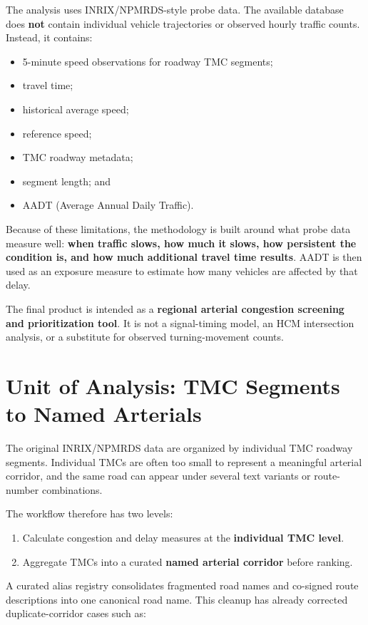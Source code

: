 \documentclass[11pt]{article}
\begin{document}
The analysis uses INRIX/NPMRDS-style probe data. The available database does \textbf{not} contain individual vehicle trajectories or observed hourly traffic counts. Instead, it contains:

\begin{itemize}
    \item 5-minute speed observations for roadway TMC segments;
    \item travel time;
    \item historical average speed;
    \item reference speed;
    \item TMC roadway metadata;
    \item segment length; and
    \item AADT (Average Annual Daily Traffic).
\end{itemize}

Because of these limitations, the methodology is built around what probe data measure well: \textbf{when traffic slows, how much it slows, how persistent the condition is, and how much additional travel time results}. AADT is then used as an exposure measure to estimate how many vehicles are affected by that delay.

The final product is intended as a \textbf{regional arterial congestion screening and prioritization tool}. It is not a signal-timing model, an HCM intersection analysis, or a substitute for observed turning-movement counts.

\section{Unit of Analysis: TMC Segments to Named Arterials}

The original INRIX/NPMRDS data are organized by individual TMC roadway segments. Individual TMCs are often too small to represent a meaningful arterial corridor, and the same road can appear under several text variants or route-number combinations.

The workflow therefore has two levels:

\begin{enumerate}
    \item Calculate congestion and delay measures at the \textbf{individual TMC level}.
    \item Aggregate TMCs into a curated \textbf{named arterial corridor} before ranking.
\end{enumerate}

A curated alias registry consolidates fragmented road names and co-signed route descriptions into one canonical road name. This cleanup has already corrected duplicate-corridor cases such as:
\end{document}
